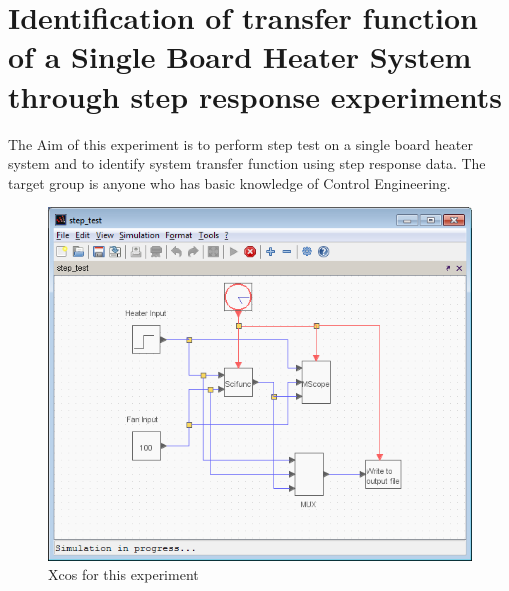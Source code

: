 \chapter{Identification of transfer function of a Single Board Heater System through step response experiments}
The Aim of this experiment is to perform step test on a single board heater system and to identify system transfer function using step response data. The target group is anyone who has basic knowledge of Control Engineering.
\begin{figure}
\centering
\includegraphics[width=\linewidth]{Step-test_manual/step.png}
\caption{Xcos for this experiment}
\label{xcos_st}
\end{figure}

